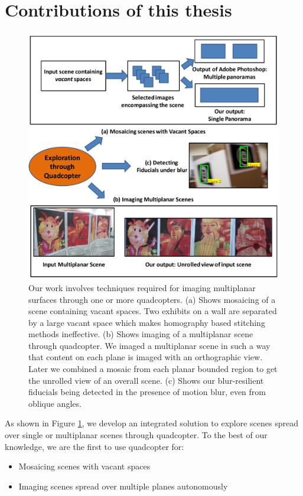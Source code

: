 \section{Contributions of this thesis}
\begin{figure}[h!]
\centering
\includegraphics[width=0.98\linewidth]{figures/contributions2}
\caption[Contributions]{Our work involves techniques required for imaging
multiplanar surfaces through one or more quadcopters. (a) Shows mosaicing of a scene containing
vacant spaces. Two exhibits on a wall are separated by  a large vacant space
which makes homography based stitching methods ineffective. (b) Shows imaging
of a multiplanar scene through quadcopter. We imaged a multiplanar scene in such
a way that content on each plane is imaged with an orthographic view. Later we
combined a mosaic from each planar bounded region to get the  unrolled view of
an overall scene. (c) Shows our blur-resilient fiducials being detected in the
presence of motion blur, even from oblique angles.}
\label{fig:contributions}
\end{figure}

As shown in Figure \ref{fig:contributions}, we develop an integrated solution to
explore scenes spread over single or multiplanar scenes through quadcopter. To
the best of our knowledge, we are the first to use quadcopter for:
\begin{itemize}
  \item Mosaicing scenes with vacant spaces  
  \item Imaging scenes spread over multiple planes autonomously   
\end{itemize}

